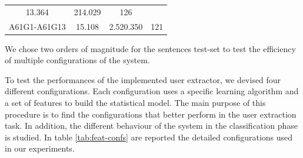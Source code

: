 \documentclass[]{book}
\begin{document}
\begin{longtable}[]{@{}cccc@{}}
\begin{minipage}[t]{0.21\columnwidth}
13.364\strut
\end{minipage} & \begin{minipage}[t]{0.18\columnwidth}\centering\strut
214.029\strut
\end{minipage} & \begin{minipage}[t]{0.33\columnwidth}\centering\strut
126\strut
\end{minipage}\tabularnewline
\begin{minipage}[t]{0.16\columnwidth}\centering\strut
A61G1-A61G13\strut
\end{minipage} & \begin{minipage}[t]{0.21\columnwidth}\centering\strut
15.108\strut
\end{minipage} & \begin{minipage}[t]{0.18\columnwidth}\centering\strut
2.520.350\strut
\end{minipage} & \begin{minipage}[t]{0.33\columnwidth}\centering\strut
121\strut
\end{minipage}\tabularnewline
\bottomrule
\end{longtable}

We chose two orders of magnitude for the sentences test-set to test the
efficiency of multiple configurations of the system.

To test the performances of the implemented user extractor, we devised
four different configurations. Each configuration uses a specific
learning algorithm and a set of features to build the statistical model.
The main purpose of this procedure is to find the configurations that
better perform in the user extraction task. In addition, the different
behaviour of the system in the classification phase is studied. In table
\ref{tab:feat-confs} are reported the detailed configurations used in
our experiments.
\end{document}

